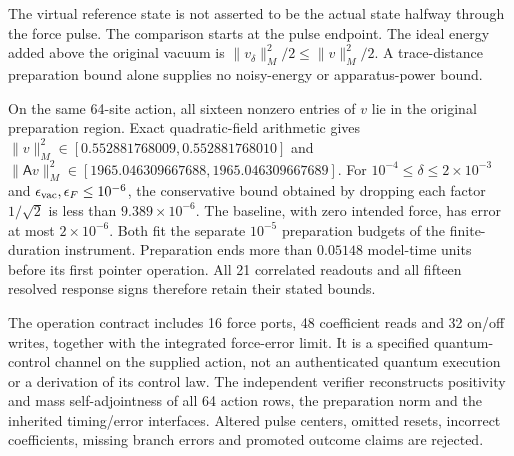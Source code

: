 The virtual reference state is not asserted to be the actual state halfway
through the force pulse. The comparison starts at the pulse endpoint.
The ideal energy added above the original vacuum is
$\|v_\delta\|_M^2/2\le\|v\|_M^2/2$. A trace-distance preparation bound
alone supplies no noisy-energy or apparatus-power bound.

On the same 64-site action, all sixteen nonzero entries of $v$ lie in the
original preparation region. Exact quadratic-field arithmetic gives
$\|v\|_M^2\in[0.552881768009,0.552881768010]$ and
$\|\mathsf A v\|_M^2\in[1965.046309667688,1965.046309667689]$.
For $10^{-4}\le\delta\le2\times10^{-3}$ and
$\epsilon_{\rm vac},\epsilon_F\le10^{-6}$, the conservative bound obtained
by dropping each factor $1/\sqrt2$ is less than $9.389\times10^{-6}$.
The baseline, with zero intended force, has error at most $2\times10^{-6}$.
Both fit the separate $10^{-5}$ preparation budgets of the finite-duration
instrument. Preparation ends more than $0.05148$ model-time units before
its first pointer operation. All 21 correlated readouts and all fifteen
resolved response signs therefore retain their stated bounds.

The operation contract includes 16 force ports, 48 coefficient reads and
32 on/off writes, together with the integrated force-error limit. It is a
specified quantum-control channel on the supplied action, not an
authenticated quantum execution or a derivation of its control law.
The independent verifier reconstructs positivity and mass self-adjointness
of all 64 action rows, the preparation norm and the inherited timing/error
interfaces. Altered pulse centers, omitted resets, incorrect coefficients,
missing branch errors and promoted outcome claims are rejected.
